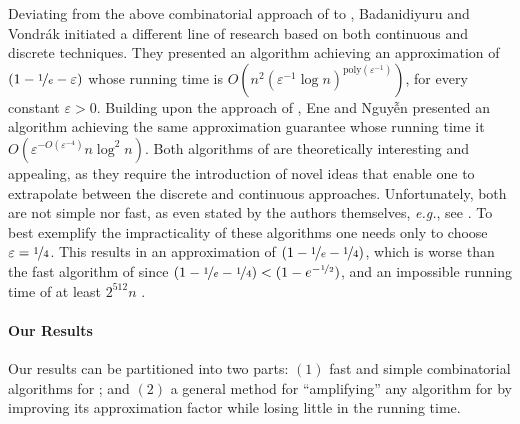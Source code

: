 Deviating from the above combinatorial approach of \cite{khuller1999budgeted,sviridenko2004note} to \SK, Badanidiyuru and Vondr\'{a}k \cite{badanidiyuru2014fast} initiated a different line of research based on both continuous and discrete techniques.
They presented an algorithm achieving an approximation of $(1-\nicefrac[]{1}{e}-\varepsilon)$ whose running time is $O(n^2(\varepsilon ^{-1}\log n)^{\text{poly}(\varepsilon^{-1})})$, for every constant $\varepsilon >0$.
Building upon the approach of \cite{badanidiyuru2014fast}, Ene and Nguy\~{\^{e}}n \cite{Alina2017} presented an algorithm achieving the same approximation guarantee whose running time it $O(\varepsilon^{-O(\varepsilon^{-4})}n \log^2 n)$.
Both algorithms of \cite{badanidiyuru2014fast,Alina2017} are theoretically interesting and appealing, as they require the introduction of novel ideas that enable one to extrapolate between the discrete and continuous approaches.
Unfortunately, both are not simple nor fast, as even stated by the authors themselves, {\em e.g.}, see \cite{Alina2017}.
To best exemplify the impracticality of these algorithms one needs only to choose $\varepsilon = \nicefrac[]{1}{4}$.
This results in an approximation of $(1-\nicefrac[]{1}{e}-\nicefrac[]{1}{4})$, which is worse than the fast algorithm of \cite{khuller1999budgeted} since $(1-\nicefrac[]{1}{e}-\nicefrac[]{1}{4})<(1-e^{-\nicefrac[]{1}{2}})$, and an impossible running time of at least $2^{512} n$ \cite{Alina2017}.

\paragraph*{Our Results}
Our results can be partitioned into two parts: $(1)$ fast and simple combinatorial algorithms for \SK; and $(2)$ a general method for ``amplifying'' any algorithm for \SK by improving its approximation factor while losing little in the running time.

